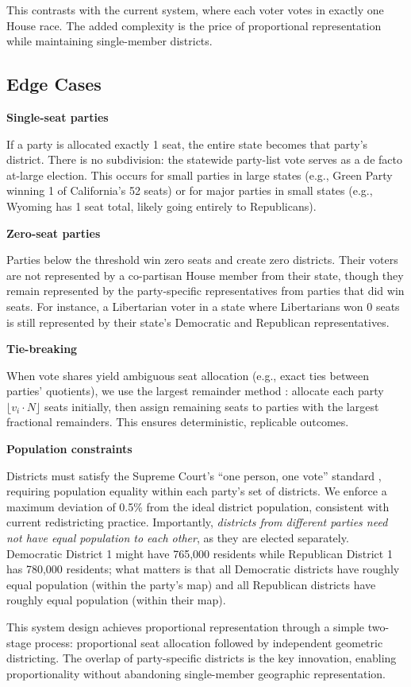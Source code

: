 This contrasts with the current system, where each voter votes in exactly one House race. The added complexity is the price of proportional representation while maintaining single-member districts.

\subsection{Edge Cases}

\textbf{Single-seat parties}

If a party is allocated exactly 1 seat, the entire state becomes that party's district. There is no subdivision: the statewide party-list vote serves as a de facto at-large election. This occurs for small parties in large states (e.g., Green Party winning 1 of California's 52 seats) or for major parties in small states (e.g., Wyoming has 1 seat total, likely going entirely to Republicans).

\textbf{Zero-seat parties}

Parties below the threshold win zero seats and create zero districts. Their voters are not represented by a co-partisan House member from their state, though they remain represented by the party-specific representatives from parties that did win seats. For instance, a Libertarian voter in a state where Libertarians won 0 seats is still represented by their state's Democratic and Republican representatives.

\textbf{Tie-breaking}

When vote shares yield ambiguous seat allocation (e.g., exact ties between parties' quotients), we use the largest remainder method \citep{gallagher2011election}: allocate each party $\lfloor v_i \cdot N \rfloor$ seats initially, then assign remaining seats to parties with the largest fractional remainders. This ensures deterministic, replicable outcomes.

\textbf{Population constraints}

Districts must satisfy the Supreme Court's ``one person, one vote'' standard \citep{reynolds1964}, requiring population equality within each party's set of districts. We enforce a maximum deviation of 0.5\% from the ideal district population, consistent with current redistricting practice. Importantly, \emph{districts from different parties need not have equal population to each other}, as they are elected separately. Democratic District 1 might have 765,000 residents while Republican District 1 has 780,000 residents; what matters is that all Democratic districts have roughly equal population (within the party's map) and all Republican districts have roughly equal population (within their map).

This system design achieves proportional representation through a simple two-stage process: proportional seat allocation followed by independent geometric districting. The overlap of party-specific districts is the key innovation, enabling proportionality without abandoning single-member geographic representation.

